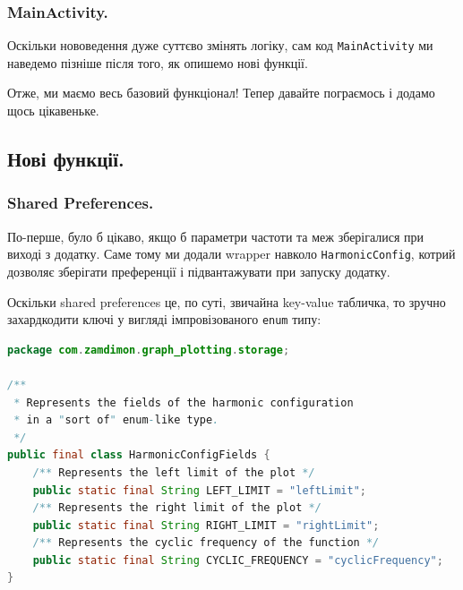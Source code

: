 \documentclass[oneside,solution]{android-assign}
\begin{document}
\subsubsection{MainActivity.} Оскільки нововедення дуже суттєво змінять логіку, сам код \texttt{MainActivity} ми наведемо пізніше після того, як опишемо нові функції.

Отже, ми маємо весь базовий функціонал! Тепер давайте пограємось і додамо щось цікавеньке.

\subsection{Нові функції.}

\subsubsection{Shared Preferences.} По-перше, було б цікаво, якщо б параметри частоти та меж зберігалися при виході з додатку. Саме тому ми додали wrapper навколо \texttt{HarmonicConfig}, котрий дозволяє зберігати преференції і підвантажувати при запуску додатку. 

Оскільки shared preferences це, по суті, звичайна key-value табличка, то зручно захардкодити ключі у вигляді імпровізованого \texttt{enum} типу:

\begin{lstlisting}[language=java]
package com.zamdimon.graph_plotting.storage;

/**
 * Represents the fields of the harmonic configuration
 * in a "sort of" enum-like type.
 */
public final class HarmonicConfigFields {
    /** Represents the left limit of the plot */
    public static final String LEFT_LIMIT = "leftLimit";
    /** Represents the right limit of the plot */
    public static final String RIGHT_LIMIT = "rightLimit";
    /** Represents the cyclic frequency of the function */
    public static final String CYCLIC_FREQUENCY = "cyclicFrequency";
}
\end{lstlisting}
\end{document}
